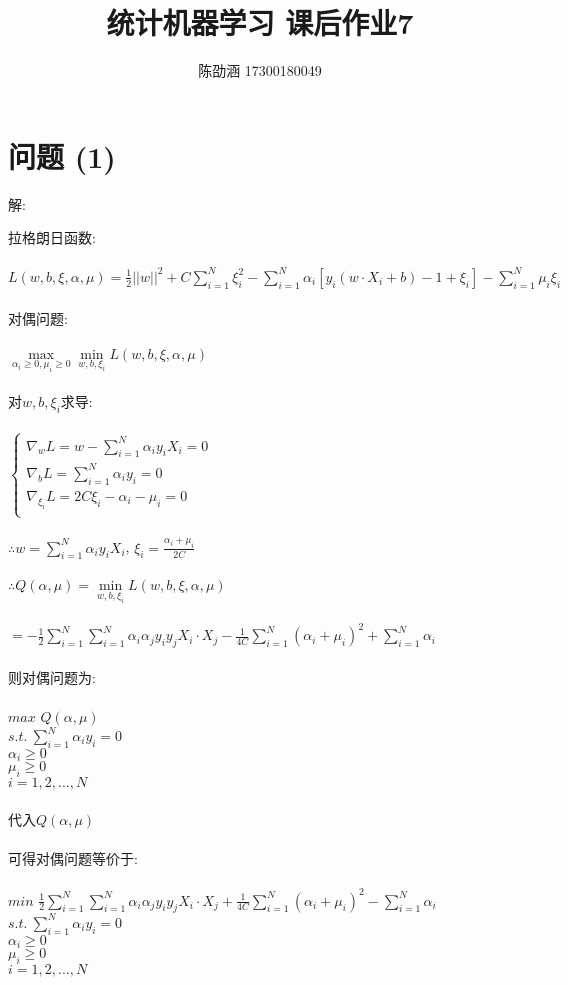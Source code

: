\documentclass[]{article}
\title{统计机器学习 课后作业7}
\author{陈劭涵 17300180049}
\begin{document}
	
\maketitle


\section{问题 (1)}
\begin{flushleft}
解:
\end{flushleft}
拉格朗日函数:\\\\
$L(w,b,\xi,\alpha,\mu)=\frac{1}{2}\vert\vert w\vert\vert^2+C\sum_{i=1}^{N}\xi_i^2-\sum_{i=1}^{N}\alpha_i[y_i(w\cdot X_i+b)-1+\xi_i]-\sum_{i=1}^{N}\mu_i\xi_i$\\\\
对偶问题:\\\\
$\mathop{max}\limits_{\alpha_i\geq0,\mu_i\geq0}\mathop{min}\limits_{w,b,\xi_i}L(w,b,\xi,\alpha,\mu)$\\\\
对$w,b,\xi_i$求导:\\\\
$\left\{\begin{matrix}
	\nabla_wL=w-\sum_{i=1}^{N}\alpha_iy_iX_i=0\\
	\nabla_bL=\sum_{i=1}^{N}\alpha_iy_i=0\\
	\nabla_{\xi_i}L=2C\xi_i-\alpha_i-\mu_i=0\\
\end{matrix}\right.$\\\\
$\therefore w=\sum_{i=1}^{N}\alpha_iy_iX_i$, $\xi_i=\frac{\alpha_i+\mu_i}{2C}$\\\\
$\therefore Q(\alpha,\mu)=\mathop{min}\limits_{w,b,\xi_i}L(w,b,\xi,\alpha,\mu)$\\\\
$=-\frac{1}{2}\sum_{i=1}^{N}\sum_{i=1}^{N}\alpha_i\alpha_jy_iy_jX_i\cdot X_j-\frac{1}{4C}\sum_{i=1}^{N}(\alpha_i+\mu_i)^2+\sum_{i=1}^{N}\alpha_i$\\\\
则对偶问题为:\\\\
$max$ $Q(\alpha,\mu)$\\
$s.t.\ \sum_{i=1}^{N}\alpha_iy_i=0$\\
$\alpha_i\geq 0$\\
$\mu_i\geq 0$\\
$i=1,2,...,N$\\\\
代入$Q(\alpha,\mu)$\\\\
可得对偶问题等价于:\\\\
$min$ $\frac{1}{2}\sum_{i=1}^{N}\sum_{i=1}^{N}\alpha_i\alpha_jy_iy_jX_i\cdot X_j+\frac{1}{4C}\sum_{i=1}^{N}(\alpha_i+\mu_i)^2-\sum_{i=1}^{N}\alpha_i$\\
$s.t.\ \sum_{i=1}^{N}\alpha_iy_i=0$\\
$\alpha_i\geq 0$\\
$\mu_i\geq 0$\\
$i=1,2,...,N$\\
\end{document}

